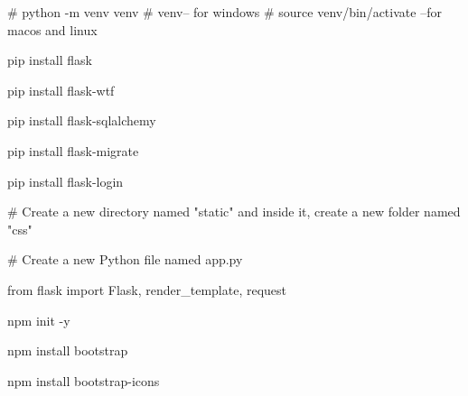 # python -m venv venv  
# venv\Scripts\activate -- for windows
# source venv/bin/activate --for macos and linux

pip install flask

pip install flask-wtf

pip install flask-sqlalchemy

pip install flask-migrate

pip install flask-login

# Create a new directory named "static" and inside it, create a new folder named "css"

# Create a new Python file named app.py

from flask import Flask, render_template, request 


npm init -y

npm install bootstrap

npm install bootstrap-icons